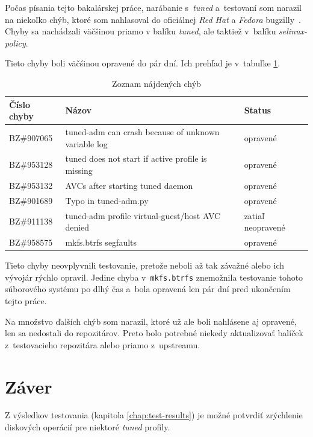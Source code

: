 Počas písania tejto bakalárskej práce, narábanie s~\emph{tuned} a~testovaní som
narazil na niekoľko chýb, ktoré som nahlasoval do oficiálnej \emph{Red Hat} a
\emph{Fedora} bugzilly~\cite{rhBugzilla}. Chyby sa nachádzali väčšinou priamo v
balíku \emph{tuned}, ale taktiež v~balíku \emph{selinux-policy}.

Tieto chyby boli väčśinou opravené do pár dní. Ich prehľad je v~tabuľke \ref{tab:bugs}.

\begin{table}[H]
\begin{center}
\begin{tabular}{|l|l|l|}
    \hline
    \textbf{Číslo chyby} & \textbf{Názov} & \textbf{Status} \\
    \hline
    BZ\#907065 & tuned-adm can crash because of unknown variable log & opravené \\
    BZ\#953128 & tuned does not start if active profile is missing & opravené \\
    BZ\#953132 & AVCs after starting tuned daemon & opravené \\
    BZ\#901689 & Typo in tuned-adm.py & opravené \\
    BZ\#911138 & tuned-adm profile virtual-guest/host AVC denied & zatiaľ neopravené \\
    BZ\#958575 & mkfs.btrfs segfaults & opravené \\
    \hline
\end{tabular}
\caption{Zoznam nájdených chýb}
\label{tab:bugs}
\end{center}
\end{table}

Tieto chyby neovplyvnili testovanie, pretože neboli až tak závažné alebo ich
vývojár rýchlo opravil. Jedine chyba v~\texttt{mkfs.btrfs} znemožnila
testovanie tohoto súborového systému po dlhý čas a~bola opravená len pár dní
pred ukončením tejto práce.

Na množstvo ďalších chýb som narazil, ktoré už ale boli nahlásene aj opravené,
len sa nedostali do repozitárov. Preto bolo potrebné niekedy aktualizovať
balíček z~testovacieho repozitára alebo priamo z~upstreamu.


%
%

\chapter{Záver}

Z výsledkov testovania (kapitola \ref{chap:test-results}) je možné potvrdiť
zrýchlenie diskových operácií pre niektoré \emph{tuned} profily. 

